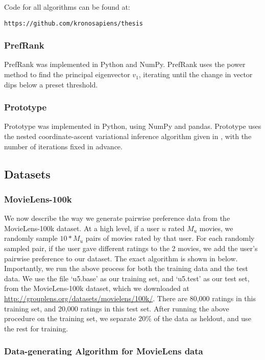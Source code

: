 Code for all algorithms can be found at:

\begin{verbatim}
https://github.com/kronosapiens/thesis	
\end{verbatim}

\subsubsection{PrefRank}

PrefRank was implemented in Python and NumPy.
PrefRank uses the power method to find the principal eigenvector $v_1$, iterating until the change in vector dips below a preset threshold. 

\subsubsection{Prototype}

Prototype was implemented in Python, using NumPy and pandas.
Prototype uses the nested coordinate-ascent variational inference algorithm given in \cite{airoldi:2008}, with the number of iterations fixed in advance.

\subsection{Datasets}
\label{sec:datasets}

\subsubsection{MovieLens-100k}
We now describe the way we generate pairwise preference data from the 
MovieLens-100k dataset.  At a high level, if a user $u$ rated $M_u$ movies,
we randomly sample $10*M_u$ pairs of movies rated by that user.  For each
randomly sampled pair, if the user gave different ratings to the 2 movies,
we add the user's pairwise preference to our dataset.  The exact algorithm
is shown in below.
Importantly, we run the above process for both the training data and the test
data.  We use the file `u5.base' as our training set, and `u5.test' as our test
set, from the MovieLens-100k dataset, which we downloaded at 
\url{http://grouplens.org/datasets/movielens/100k/}.  
There are 80,000 ratings in this training
set, and 20,000 ratings in this test set.
After running the above procedure on the training set, we separate $20\%$ of the
data as heldout, and use the rest for training.

\subsubsection{Data-generating Algorithm for MovieLens data}

